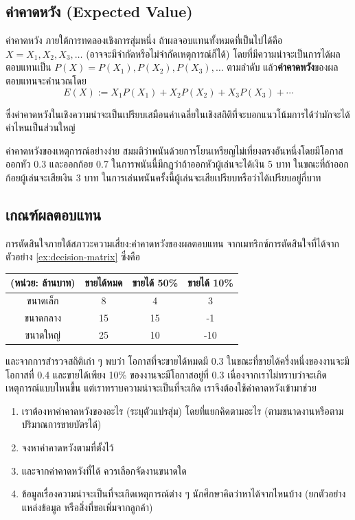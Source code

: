 \subsection{ค่าคาดหวัง (Expected Value)}
\begin{definition}
    {ค่าคาดหวัง}{}
    ภายใต้การทดลองเชิงการสุ่มหนึ่ง ถ้าผลจอบแทนทั้งหมดที่เป็นไปได้คือ $X = X_1, X_2, X_3, \dots$ (อาจจะมีจำกัดหรือไม่จำกัดเหตุการณ์ก็ได้) โดยที่มีความน่าจะเป็นการได้ผลตอบแทนเป็น $P(X) = P(X_1), P(X_2), P(X_3), \dots$ ตามลำดับ
    แล้ว\textbf{ค่าคาดหวัง}ของผลตอบแทนจะคำนวณโดย
    $$
    E(X) := X_1 P(X_1) + X_2 P(X_2) + X_3 P(X_3) + \cdots
    $$
\end{definition}
ซึ่งค่าคาดหวังในเชิงความน่าจะเป็นเปรียบเสมือนค่าเฉลี่ยในเชิงสถิติที่จะบอกแนวโน้มการได้ว่ามักจะได้ค่าไหนเป็นส่วนใหญ่
\begin{example}
    {ค่าคาดหวังของเหตุการณ์อย่างง่าย}{}
    สมมติว่าพนันด้วยการโยนเหรียญไม่เที่ยงตรงอันหนึ่งโดยมีโอกาสออกหัว 0.3 และออกก้อย 0.7 ในการพนันนี้มีกฏว่าถ้าออกหัวผู้เล่นจะได้เงิน 5 บาท ในขณะที่ถ้าออกก้อยผู้เล่นจะเสียเงิน 3 บาท ในการเล่นพนันครั้งนี้ผู้เล่นจะเสียเปรียบหรือว่าได้เปรียบอยู่กี่บาท
\end{example}

\newpage
\subsection{เกณฑ์ผลตอบแทน}
\begin{example}
    {การตัดสินใจภายใต้สภาวะความเสี่ยง:ค่าคาดหวังของผลตอบแทน}{}
    จากเมทริกซ์การตัดสินใจที่ได้จากตัวอย่าง \ref{ex:decision-matrix} ซึ่งคือ
    \begin{center}
        \begin{tabular}{|c|c|c|c|}
        \hline
            (หน่วย: ล้านบาท) & ขายได้หมด & ขายได้ 50\% & ขายได้ 10\% \\ \hline
            ขนาดเล็ก & 8 & 4 & 3 \\
            ขนาดกลาง & 15 & 15 & -1\\
            ขนาดใหญ่ & 25 & 10 & -10\\ \hline
        \end{tabular}
    \end{center}
    และจากการสำรวจสถิติเก่า ๆ พบว่า โอกาสที่จะขายได้หมดมี 0.3 ในขณะที่ขายได้ครึ่งหนึ่งของงานจะมีโอกาสที่ 0.4 และขายได้เพียง 10\% ของงานจะมีโอกาสอยู่ที่ 0.3
    เนื่องจากเราไม่ทราบว่าจะเกิดเหตุการณ์แบบไหนขึ้น แต่เราทราบความน่าจะเป็นที่จะเกิด เราจึงต้องใช้ค่าคาดหวังเข้ามาช่วย 
    \begin{enumerate}
        \item เราต้องหาค่าคาดหวังของอะไร (ระบุตัวแปรสุ่ม) โดยที่แยกคิดตามอะไร (ตามขนาดงานหรือตามปริมาณการขายบัตรได้)
        \item จงหาค่าคาดหวังตามที่ตั้งไว้
        \item และจากค่าคาดหวังที่ได้ ควรเลือกจัดงานขนาดใด
        \item ข้อมูลเรื่องความน่าจะเป็นที่จะเกิดเหตุการณ์ต่าง ๆ นักศึกษาคิดว่าหาได้จากไหนบ้าง (ยกตัวอย่างแหล่งข้อมูล หรือสิ่งที่ขอเพิ่มจากลูกค้า)
    \end{enumerate}
\end{example}
\newpage
